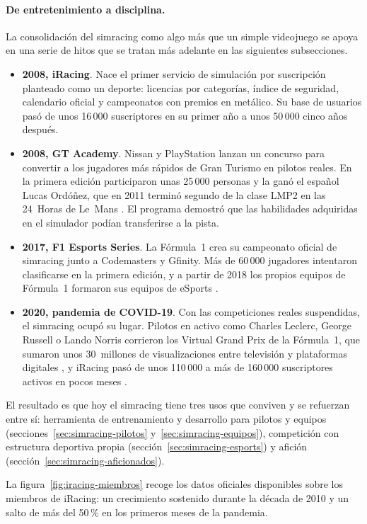 \paragraph{De entretenimiento a disciplina.}
La consolidación del simracing como algo más que un simple videojuego se apoya en una serie de hitos que se tratan más adelante en las siguientes subsecciones.
\begin{itemize}
	\item \textbf{2008, iRacing}. Nace el primer servicio de simulación por suscripción planteado como un deporte: licencias por categorías, índice de seguridad, calendario oficial y campeonatos con premios en metálico. Su base de usuarios pasó de unos 16\,000 suscriptores en su primer año a unos 50\,000 cinco años después.
	\item \textbf{2008, GT Academy}. Nissan y PlayStation lanzan un concurso para convertir a los jugadores más rápidos de Gran Turismo en pilotos reales. En la primera edición participaron unas 25\,000 personas y la ganó el español Lucas Ordóñez, que en 2011 terminó segundo de la clase LMP2 en las 24~Horas de Le~Mans \parencite{granturismo_web}. El programa demostró que las habilidades adquiridas en el simulador podían transferirse a la pista.
	\item \textbf{2017, F1 Esports Series}. La Fórmula~1 crea su campeonato oficial de simracing junto a Codemasters y Gfinity. Más de 60\,000 jugadores intentaron clasificarse en la primera edición, y a partir de 2018 los propios equipos de Fórmula~1 formaron sus equipos de eSports \parencite{formula1_news}.
	\item \textbf{2020, pandemia de COVID-19}. Con las competiciones reales suspendidas, el simracing ocupó su lugar. Pilotos en activo como Charles Leclerc, George Russell o Lando Norris corrieron los Virtual Grand Prix de la Fórmula~1, que sumaron unos 30~millones de visualizaciones entre televisión y plataformas digitales \parencite{formula1_news}, y iRacing pasó de unos 110\,000 a más de 160\,000 suscriptores activos en pocos meses \parencite{iracing_news}.
\end{itemize}
El resultado es que hoy el simracing tiene tres usos que conviven y se refuerzan entre sí: herramienta de entrenamiento y desarrollo para pilotos y equipos (secciones~\ref{sec:simracing-pilotos} y~\ref{sec:simracing-equipos}), competición con estructura deportiva propia (sección~\ref{sec:simracing-esports}) y afición (sección~\ref{sec:simracing-aficionados}).

La figura~\ref{fig:iracing-miembros} recoge los datos oficiales disponibles sobre los miembros de iRacing: un crecimiento sostenido durante la década de 2010 y un salto de más del 50\,\% en los primeros meses de la pandemia.

